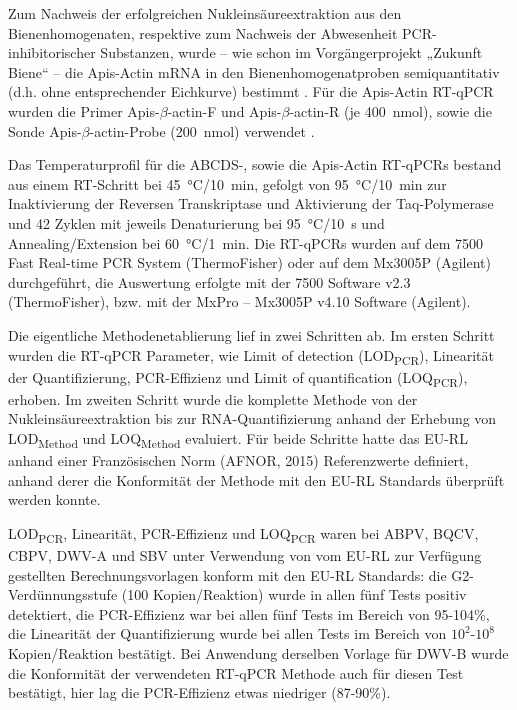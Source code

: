 Zum Nachweis der erfolgreichen Nukleinsäureextraktion aus den Bienenhomogenaten, respektive zum Nachweis der Abwesenheit PCR-inhibitorischer Substanzen, wurde – wie schon im Vorgängerprojekt „Zukunft Biene“ – die Apis-Actin mRNA in den Bienenhomogenatproben semiquantitativ (d.h. ohne entsprechender Eichkurve) bestimmt \citep{morawetz2018}. Für die Apis-Actin RT-qPCR wurden die Primer Apis-$\beta$-actin-F und Apis-$\beta$-actin-R (je \SI{400}{\nano\mol}), sowie die Sonde Apis-$\beta$-actin-Probe (\SI{200}{\nano\mol}) verwendet \citep{chen2005}.

Das Temperaturprofil für die ABCDS-, sowie die Apis-Actin RT-qPCRs bestand aus einem RT-Schritt bei \SI{45}{\degreeCelsius}/\SI{10}{\minute}, gefolgt von \SI{95}{\degreeCelsius}/\SI{10}{\minute} zur Inaktivierung der Reversen Transkriptase und Aktivierung der Taq-Polymerase und 42 Zyklen mit jeweils Denaturierung bei \SI{95}{\degreeCelsius}/\SI{10}{\second} und Annealing/Extension bei \SI{60}{\degreeCelsius}/\SI{1}{\minute}. Die RT-qPCRs wurden auf dem 7500 Fast Real-time PCR System (ThermoFisher) oder auf dem Mx3005P (Agilent) durchgeführt, die Auswertung erfolgte mit der 7500 Software v2.3 (ThermoFisher), bzw. mit der MxPro – Mx3005P v4.10 Software (Agilent).

Die eigentliche Methodenetablierung lief in zwei Schritten ab. Im ersten Schritt wurden die RT-qPCR Parameter, wie Limit of detection (LOD\textsubscript{PCR}), Linearität der Quantifizierung, PCR-Effizienz und Limit of quantification (LOQ\textsubscript{PCR}), erhoben. Im zweiten Schritt wurde die komplette Methode von der Nukleinsäureextraktion bis zur RNA-Quantifizierung anhand der Erhebung von LOD\textsubscript{Method} und LOQ\textsubscript{Method} evaluiert. Für beide Schritte hatte das EU-RL anhand einer Französischen Norm (AFNOR, 2015) Referenzwerte definiert, anhand derer die Konformität der Methode mit den EU-RL Standards überprüft werden konnte.

LOD\textsubscript{PCR}, Linearität, PCR-Effizienz und LOQ\textsubscript{PCR} waren bei ABPV, BQCV, CBPV, DWV-A und SBV unter Verwendung von vom EU-RL zur Verfügung gestellten Berechnungsvorlagen konform mit den EU-RL Standards: die G2-Verdünnungsstufe (100 Kopien/Reaktion) wurde in allen fünf Tests positiv detektiert, die PCR-Effizienz war bei allen fünf Tests im Bereich von 95-104\%, die Linearität der Quantifizierung wurde bei allen Tests im Bereich von $10^2$-$10^8$ Kopien/Reaktion bestätigt. Bei Anwendung derselben Vorlage für DWV-B wurde die Konformität der verwendeten RT-qPCR Methode auch für diesen Test bestätigt, hier lag die PCR-Effizienz etwas niedriger (87-90\%).

